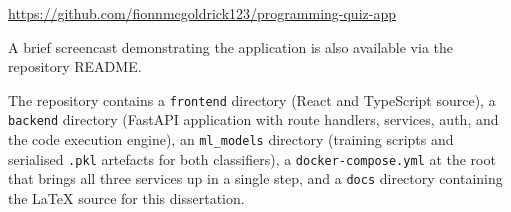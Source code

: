 \begin{center}
\url{https://github.com/fionnmcgoldrick123/programming-quiz-app}
\end{center}

A brief screencast demonstrating the application is also available via
the repository README.

The repository contains a \texttt{frontend} directory (React and
TypeScript source), a \texttt{backend} directory (FastAPI application
with route handlers, services, auth, and the code execution engine),
an \texttt{ml\_models} directory (training scripts and serialised
\texttt{.pkl} artefacts for both classifiers), a
\texttt{docker-compose.yml} at the root that brings all three services
up in a single step, and a \texttt{docs} directory containing the
LaTeX source for this dissertation.